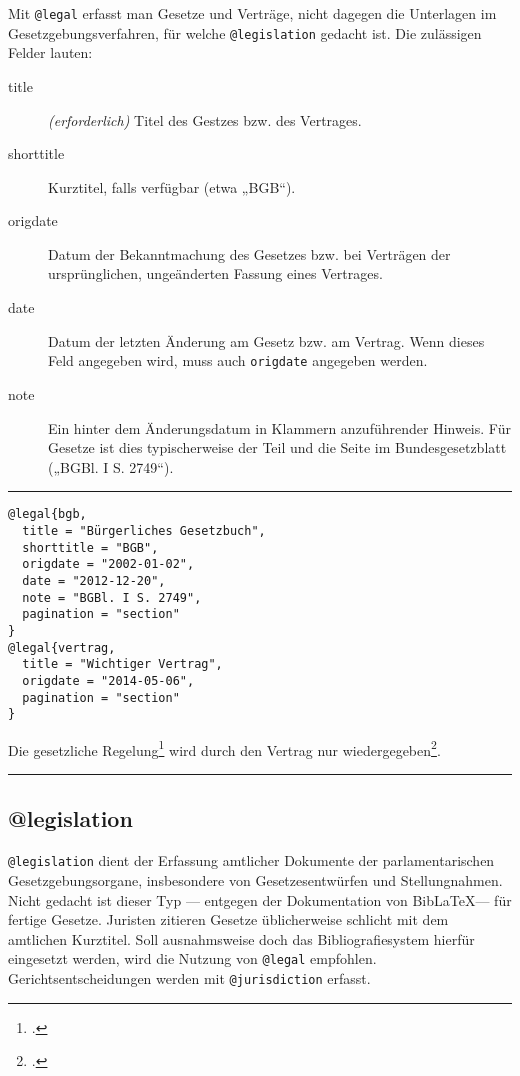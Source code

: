 \documentclass[11pt,a4paper,DIV=calc]{scrartcl}
\newcommand\software[1]{\textsf{#1}}
\newcommand\Biblatex{\software{Bib\LaTeX{}}\xspace}
\newenvironment{rubexample}{\par\vspace{\baselineskip}\hrule\par\begin{refsection}}{\end{refsection}\par\hrule\par\vspace{\baselineskip}}
\begin{document}
Mit \verb+@legal+ erfasst man Gesetze und Verträge, nicht dagegen die
Unterlagen im Gesetzgebungsverfahren, für welche \verb+@legislation+
gedacht ist. Die zulässigen Felder lauten:

\begin{description}
\item[title] \emph{(erforderlich)} Titel des Gestzes bzw. des
  Vertrages.
\item[shorttitle] Kurztitel, falls verfügbar (etwa „BGB“).
\item[origdate] Datum der Bekanntmachung des Gesetzes bzw. bei
  Verträgen der ursprünglichen, ungeänderten Fassung eines Vertrages.
\item[date] Datum der letzten Änderung am Gesetz bzw. am Vertrag. Wenn
  dieses Feld angegeben wird, muss auch \verb+origdate+ angegeben
  werden.
\item[note] Ein hinter dem Änderungsdatum in Klammern anzuführender
  Hinweis. Für Gesetze ist dies typischerweise der Teil und die Seite
  im Bundesgesetzblatt („BGBl. I S. 2749“).
\end{description}

\begin{rubexample}
\begin{verbatim}
@legal{bgb,
  title = "Bürgerliches Gesetzbuch",
  shorttitle = "BGB",
  origdate = "2002-01-02",
  date = "2012-12-20",
  note = "BGBl. I S. 2749",
  pagination = "section"
}
@legal{vertrag,
  title = "Wichtiger Vertrag",
  origdate = "2014-05-06",
  pagination = "section"
}
\end{verbatim}

Die gesetzliche Regelung\footcite[582]{bgb} wird durch den Vertrag nur
wiedergegeben\footcite[11]{vertrag}.

\printbibliography
\end{rubexample}

\subsection{@legislation}

\verb+@legislation+ dient der Erfassung amtlicher Dokumente der
parlamentarischen Gesetzgebungsorgane, insbesondere von
Gesetzesentwürfen und Stellungnahmen. Nicht gedacht ist dieser Typ —
entgegen der Dokumentation von \Biblatex — für fertige Gesetze.
Juristen zitieren Gesetze üblicherweise schlicht mit dem
amtlichen Kurztitel. Soll ausnahmsweise doch das Bibliografiesystem
hierfür eingesetzt werden, wird die Nutzung von \verb+@legal+
empfohlen. Gerichtsentscheidungen werden mit \verb+@jurisdiction+
erfasst.
\end{document}
